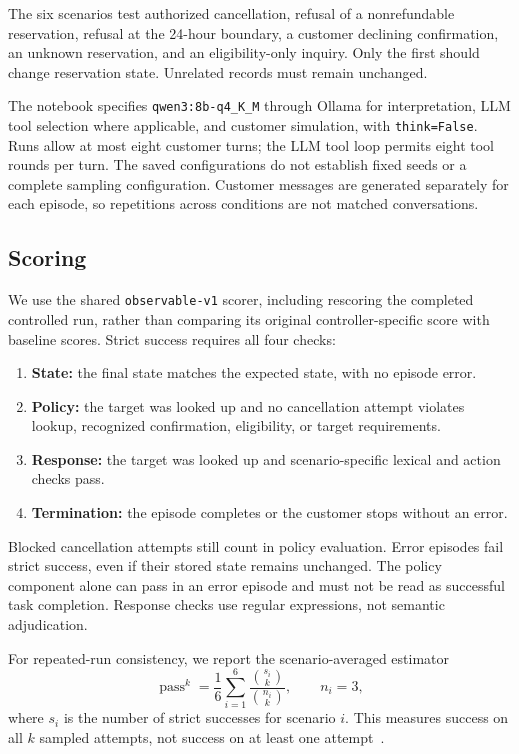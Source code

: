 \documentclass[11pt]{article}
\begin{document}
The six scenarios test authorized cancellation, refusal of a nonrefundable reservation, refusal at the 24-hour boundary, a customer declining confirmation, an unknown reservation, and an eligibility-only inquiry. Only the first should change reservation state. Unrelated records must remain unchanged.

The notebook specifies \texttt{qwen3:8b-q4\_K\_M} through Ollama for interpretation, LLM tool selection where applicable, and customer simulation, with \texttt{think=False}. Runs allow at most eight customer turns; the LLM tool loop permits eight tool rounds per turn. The saved configurations do not establish fixed seeds or a complete sampling configuration. Customer messages are generated separately for each episode, so repetitions across conditions are not matched conversations.

\subsection{Scoring}
We use the shared \texttt{observable-v1} scorer, including rescoring the completed controlled run, rather than comparing its original controller-specific score with baseline scores. Strict success requires all four checks:
\begin{enumerate}
\item \textbf{State:} the final state matches the expected state, with no episode error.
\item \textbf{Policy:} the target was looked up and no cancellation attempt violates lookup, recognized confirmation, eligibility, or target requirements.
\item \textbf{Response:} the target was looked up and scenario-specific lexical and action checks pass.
\item \textbf{Termination:} the episode completes or the customer stops without an error.
\end{enumerate}
Blocked cancellation attempts still count in policy evaluation. Error episodes fail strict success, even if their stored state remains unchanged. The policy component alone can pass in an error episode and must not be read as successful task completion. Response checks use regular expressions, not semantic adjudication.

For repeated-run consistency, we report the scenario-averaged estimator
\begin{equation}
\operatorname{pass}^{k}=\frac{1}{6}\sum_{i=1}^{6}
\frac{\binom{s_i}{k}}{\binom{n_i}{k}},\qquad n_i=3,
\end{equation}
where $s_i$ is the number of strict successes for scenario $i$. This measures success on all $k$ sampled attempts, not success on at least one attempt~\cite{yao2024tau}.
\end{document}
